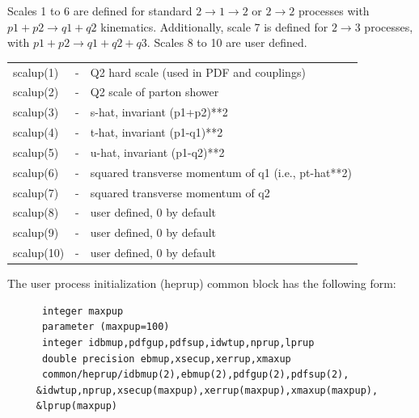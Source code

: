 Scales 1 to 6 are defined for standard $2\rightarrow1\rightarrow2$ or $2\rightarrow2$ processes
with $p1 + p2 \rightarrow q1 + q2$ kinematics.
Additionally, scale 7 is defined for $2\rightarrow3$ processes,
with $p1 + p2 \rightarrow q1 + q2 + q3$.
Scales 8 to 10 are user defined.
\begin{center}
\begin{tabular}{lcl}
     scalup(1)&-& Q2 hard scale (used in PDF and couplings)\\
     scalup(2)&-& Q2 scale of parton shower\\
     scalup(3)&-& s-hat, invariant (p1+p2)**2\\
     scalup(4)&-& t-hat, invariant (p1-q1)**2\\
     scalup(5)&-& u-hat, invariant (p1-q2)**2\\
     scalup(6)&-& squared transverse momentum of q1 (i.e., pt-hat**2)\\
     scalup(7)&-& squared transverse momentum of q2\\
     scalup(8)&-& user defined, 0 by default\\
     scalup(9)&-& user defined, 0 by default\\
     scalup(10)&-& user defined, 0 by default\\
\end{tabular}
\end{center}

\noindent The user process initialization (heprup) common block has the following form:
\begin{verbatim}
      integer maxpup
      parameter (maxpup=100)
      integer idbmup,pdfgup,pdfsup,idwtup,nprup,lprup
      double precision ebmup,xsecup,xerrup,xmaxup
      common/heprup/idbmup(2),ebmup(2),pdfgup(2),pdfsup(2),
     &idwtup,nprup,xsecup(maxpup),xerrup(maxpup),xmaxup(maxpup),
     &lprup(maxpup)
\end{verbatim}

